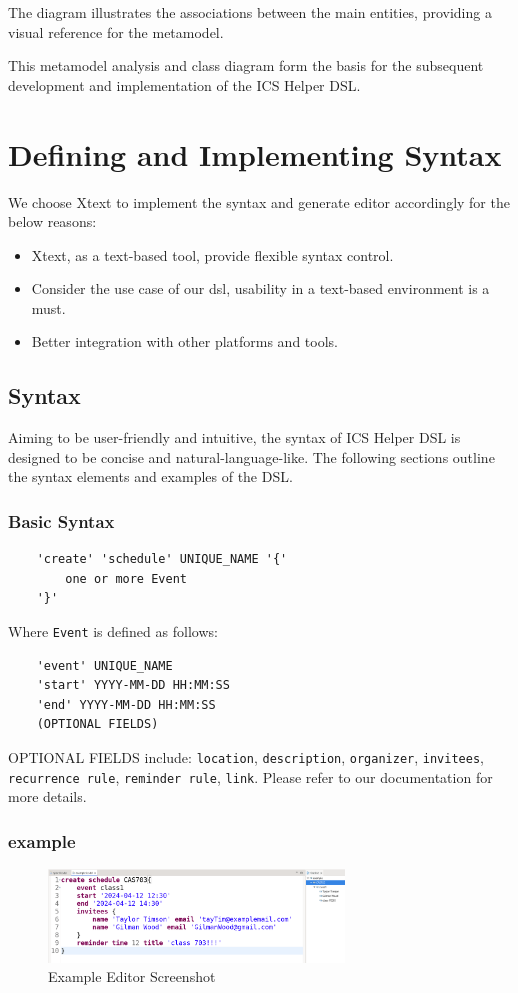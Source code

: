\documentclass[12pt, letterpaper, twoside]{article}
\begin{document}
The diagram illustrates the associations between the main entities, providing a visual reference for the metamodel.

This metamodel analysis and class diagram form the basis for the subsequent development and implementation of the ICS Helper DSL.


\newpage
\section{Defining and Implementing Syntax}
We choose Xtext to implement the syntax and generate editor accordingly for the below reasons:

\begin{itemize}
    \item Xtext, as a text-based tool, provide flexible syntax control.
    \item Consider the use case of our dsl, usability in a text-based environment is a must.
    \item Better integration with other platforms and tools.
\end{itemize}

\subsection{Syntax}
Aiming to be user-friendly and intuitive, the syntax of ICS Helper DSL is designed to be concise and natural-language-like. 
The following sections outline the syntax elements and examples of the DSL.
\subsubsection{Basic Syntax}
\begin{verbatim}
    'create' 'schedule' UNIQUE_NAME '{'
        one or more Event
    '}'
\end{verbatim}

Where \texttt{Event} is defined as follows:

\begin{verbatim}
    'event' UNIQUE_NAME
    'start' YYYY-MM-DD HH:MM:SS
    'end' YYYY-MM-DD HH:MM:SS
    (OPTIONAL FIELDS)
\end{verbatim}
OPTIONAL FIELDS include: \texttt{location}, \texttt{description}, \texttt{organizer}, \texttt{invitees}, \texttt{recurrence rule}, \texttt{reminder rule}, \texttt{link}. 
Please refer to our documentation for more details.

\subsubsection{example}
\begin{figure}[H]
    \centering
    \includegraphics[width=0.7\textwidth]{editor_example.png}
    \caption{Example Editor Screenshot}
    \label{fig:class-diagram}
\end{figure}
\end{document}

